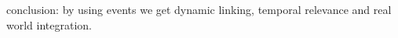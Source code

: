 conclusion: by using events we get dynamic linking, temporal relevance and real world integration.




